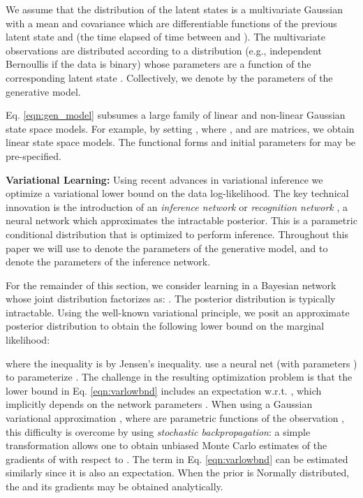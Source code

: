 \documentclass[letterpaper]{article}
\theoremstyle{plain}
\begin{document}
We assume that the distribution of the latent states is a multivariate
Gaussian with a mean and covariance which are differentiable functions of the previous latent state and  (the time elapsed
of time between  and ). 
The multivariate observations  are distributed according to a distribution  
(e.g., independent Bernoullis if the data is binary) whose parameters are a function of the corresponding latent state .
Collectively, we denote by  the parameters of the generative model. 

Eq. \ref{eqn:gen_model} subsumes a large family of linear 
and non-linear Gaussian state space models. 
For example, by setting , where ,  and  are matrices,
we obtain linear state space models. 
The functional forms
and initial parameters for  may be pre-specified.

\textbf{Variational Learning: }
Using recent advances in variational inference 
we optimize a variational lower bound on the data log-likelihood. 
The key technical innovation is the introduction of an \emph{inference network} or \emph{recognition network} \cite{hinton1995wake,kingma2013auto,mnih2014neural,rezende2014stochastic}, a neural network which approximates the intractable posterior. This is a parametric conditional distribution that is optimized to perform inference. 
Throughout this paper we will use  to denote the parameters of the generative model, and  to denote the parameters of the inference network.

For the remainder of this section, we consider learning in a Bayesian network whose joint distribution factorizes as:
. 
The posterior distribution  is typically intractable. Using the well-known 
variational principle, we posit an approximate posterior distribution  to
obtain the following lower bound on the marginal likelihood:

where the inequality is by Jensen's inequality. 
\citeauthor{kingma2013auto,rezende2014stochastic} use a neural net (with parameters ) to parameterize .
The challenge in the resulting optimization problem is that the lower bound in Eq. \ref{eqn:varlowbnd} includes an expectation w.r.t. , which implicitly depends on the network parameters . 
When using a Gaussian variational approximation 
, 
where  are parametric functions of the
observation , this difficulty is overcome by using \emph{stochastic backpropagation}:
a simple transformation allows 
one to obtain unbiased Monte Carlo estimates of the gradients of  with respect to .
The  term in Eq. \ref{eqn:varlowbnd} can be estimated similarly since it is also an expectation. 
When the prior  is Normally distributed, the  and its gradients 
may be obtained analytically.
\end{document}
